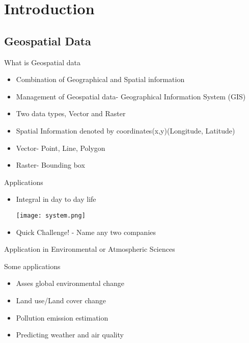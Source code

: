 \section[Introduction]{Introduction}
\subsection[Geospatial Data]{Geospatial Data}


\begin{frame}{What is Geospatial data}
\begin{beamerboxesrounded}{}
	\begin{itemize}
		\item Combination of Geographical and Spatial information 
		\item Management of Geospatial data- Geographical Information System (GIS)
		\item Two data types, Vector and Raster 
		\item Spatial Information denoted by coordinates(x,y)(Longitude, Latitude)
		\item Vector- Point, Line, Polygon
		\item Raster- Bounding box
\end{itemize}
\end{beamerboxesrounded}
\end{frame}


\begin{frame}{Applications}
	\begin{beamerboxesrounded}{}
		\begin{itemize}
			\item Integral in day to day life
			
			{\centering
			\texttt{[image: system.png]} }
			
			\item Quick Challenge! - Name any two companies 
		\end{itemize}
	\end{beamerboxesrounded}
\end{frame}


\begin{frame}{Application in Environmental or Atmospheric Sciences}
	\begin{beamerboxesrounded}{Some applications}
		\begin{itemize}
			\item Asses global environmental change
			\item Land use/Land cover change  
			\item Pollution emission estimation
			\item Predicting weather and air quality
		\end{itemize}
	\end{beamerboxesrounded}
\end{frame}

